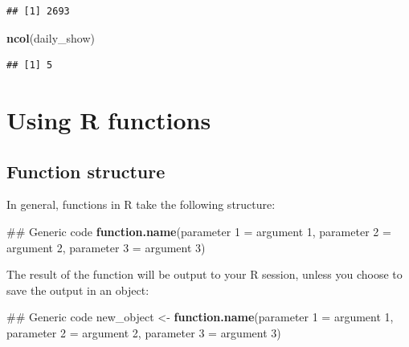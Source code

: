 \documentclass[]{book}
\makeatletter
\newenvironment{Shaded}{\begin{snugshade}}{\end{snugshade}}
\newcommand{\KeywordTok}[1]{\textcolor[rgb]{0.13,0.29,0.53}{\textbf{#1}}}
\newcommand{\DecValTok}[1]{\textcolor[rgb]{0.00,0.00,0.81}{#1}}
\newcommand{\StringTok}[1]{\textcolor[rgb]{0.31,0.60,0.02}{#1}}
\newcommand{\NormalTok}[1]{#1}
\newenvironment{kframe}{%
\medskip{}
\setlength{\fboxsep}{.8em}
 \def\at@end@of@kframe{}%
 \ifinner\ifhmode%
  \def\at@end@of@kframe{\end{minipage}}%
  \begin{minipage}{\columnwidth}%
 \fi\fi%
 \def\FrameCommand##1{\hskip\@totalleftmargin \hskip-\fboxsep
 \colorbox{shadecolor}{##1}\hskip-\fboxsep
     \hskip-\linewidth \hskip-\@totalleftmargin \hskip\columnwidth}%
 \MakeFramed {\advance\hsize-\width
   \@totalleftmargin\z@ \linewidth\hsize
   \@setminipage}}%
 {\par\unskip\endMakeFramed%
 \at@end@of@kframe}
\renewenvironment{Shaded}{\begin{kframe}}{\end{kframe}}
\theoremstyle{definition}
\theoremstyle{definition}
\theoremstyle{definition}
\theoremstyle{remark}
\makeatother
\begin{document}
\begin{verbatim}
## [1] 2693
\end{verbatim}

\begin{Shaded}
\begin{Highlighting}[]
\KeywordTok{ncol}\NormalTok{(daily_show)}
\end{Highlighting}
\end{Shaded}

\begin{verbatim}
## [1] 5
\end{verbatim}

\section{Using R functions}\label{using-r-functions}

\subsection{Function structure}\label{function-structure}

In general, functions in R take the following structure:

\begin{Shaded}
\begin{Highlighting}[]
\NormalTok{## Generic code}
\KeywordTok{function.name}\NormalTok{(parameter }\DecValTok{1}\NormalTok{ =}\StringTok{ }\NormalTok{argument }\DecValTok{1}\NormalTok{, parameter }\DecValTok{2}\NormalTok{ =}\StringTok{ }\NormalTok{argument }\DecValTok{2}\NormalTok{,}
\NormalTok{              parameter }\DecValTok{3}\NormalTok{ =}\StringTok{ }\NormalTok{argument }\DecValTok{3}\NormalTok{)  }
\end{Highlighting}
\end{Shaded}

The result of the function will be output to your R session, unless you
choose to save the output in an object:

\begin{Shaded}
\begin{Highlighting}[]
\NormalTok{## Generic code}
\NormalTok{new_object <-}\StringTok{ }\KeywordTok{function.name}\NormalTok{(parameter }\DecValTok{1}\NormalTok{ =}\StringTok{ }\NormalTok{argument }\DecValTok{1}\NormalTok{,}
\NormalTok{                            parameter }\DecValTok{2}\NormalTok{ =}\StringTok{ }\NormalTok{argument }\DecValTok{2}\NormalTok{,}
\NormalTok{                            parameter }\DecValTok{3}\NormalTok{ =}\StringTok{ }\NormalTok{argument }\DecValTok{3}\NormalTok{)  }
\end{Highlighting}
\end{Shaded}
\end{document}
